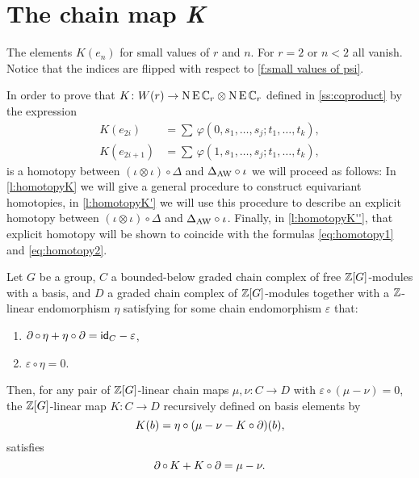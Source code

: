 
\appendix
\newpage
\section{The chain map \textit{K}}\label{s:chain homotopy K}

\begin{table}
	\centering
	
	\caption{The elements $K(e_n)$ for small values of $r$ and $n$. For $r=2$ or $n<2$ all vanish. Notice that the indices are flipped with respect to \cref{f:small values of psi}.}
	\label{f:small values of K}
\end{table}


In order to prove that $K \colon W(r) \to \operatorname{N}\operatorname{E}\mathbb{C}_r \otimes \operatorname{N}\operatorname{E}\mathbb{C}_r$ defined in \cref{ss:coproduct} by the expression
\begin{align}
	\label{eq:homotopy1}
	K(e_{2i})   &= \sum \, \varphi(0,s_1,\dots,s_j;t_1,\dots,t_k), \\
	\label{eq:homotopy2}
	K(e_{2i+1}) &= \sum \, \varphi(1,s_1,\dots,s_j;t_1,\dots,t_k),
\end{align}
is a homotopy between $(\iota\otimes \iota)\circ \Delta$ and $\Delta_{\operatorname{AW}}\circ \iota$ we will proceed as follows: In \cref{l:homotopyK} we will give a general procedure to construct equivariant homotopies, in \cref{l:homotopyK'} we will use this procedure to describe an explicit homotopy between $(\iota\otimes \iota)\circ \Delta$ and $\Delta_{\operatorname{AW}}\circ \iota$. Finally, in \cref{l:homotopyK''}, that explicit homotopy will be shown to coincide with the formulas \eqref{eq:homotopy1} and \eqref{eq:homotopy2}.

\begin{lemma}\label{l:homotopyK}
	Let $G$ be a group, $C$ a bounded-below graded chain complex of free $\mathbb{Z}[G]$-modules with a basis, and $D$ a graded chain complex of $\mathbb{Z}[G]$-modules together with a $\mathbb{Z}$-linear endomorphism $\eta$ satisfying for some chain endomorphism $\varepsilon$ that:
	\begin{enumerate}
		\item $\operatorname{\partial} \circ \, \eta + \eta \circ \operatorname{\partial} = \mathsf{id}_C - \varepsilon$,
		\item $\varepsilon\circ \eta = 0$.
	\end{enumerate}
	Then, for any pair of $\mathbb{Z}[G]$-linear chain maps $\mu,\nu \colon C \to D$ with $\varepsilon \circ (\mu-\nu) = 0$, the $\mathbb{Z}[G]$-linear map $K \colon C \to D$ recursively defined on basis elements by
	\[
	K(b) = \eta \circ (\mu - \nu - K \circ \operatorname{\partial})(b),
	\]
	satisfies
	\[
	\operatorname{\partial} \circ \, K + K \circ \operatorname{\partial} = \mu - \nu.
	\]
\end{lemma}

